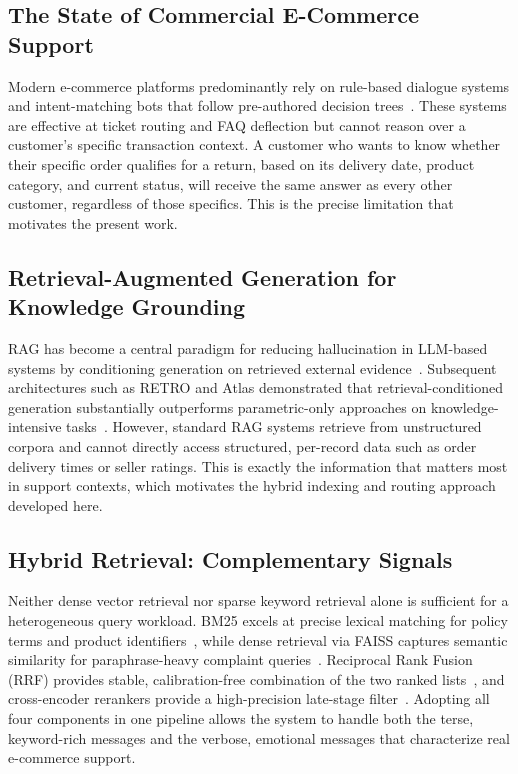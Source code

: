 \documentclass[conference]{IEEEtran}
\begin{document}
\subsection{The State of Commercial E-Commerce Support}
Modern e-commerce platforms predominantly rely on rule-based dialogue systems and
intent-matching bots that follow pre-authored decision trees~\cite{b21}. These
systems are effective at ticket routing and FAQ deflection but cannot reason over
a customer's specific transaction context. A customer who wants to know whether
their specific order qualifies for a return, based on its delivery date, product
category, and current status, will receive the same answer as every other customer,
regardless of those specifics. This is the precise limitation that motivates the
present work.

\subsection{Retrieval-Augmented Generation for Knowledge Grounding}
RAG has become a central paradigm for reducing hallucination in LLM-based systems
by conditioning generation on retrieved external evidence~\cite{b1,b2}. Subsequent
architectures such as RETRO and Atlas demonstrated that retrieval-conditioned
generation substantially outperforms parametric-only approaches on knowledge-intensive
tasks~\cite{b3,b4}. However, standard RAG systems retrieve from unstructured corpora
and cannot directly access structured, per-record data such as order delivery times
or seller ratings. This is exactly the information that matters most in support
contexts, which motivates the hybrid indexing and routing approach developed here.

\subsection{Hybrid Retrieval: Complementary Signals}
Neither dense vector retrieval nor sparse keyword retrieval alone is sufficient for
a heterogeneous query workload. BM25 excels at precise lexical matching for
policy terms and product identifiers~\cite{b5}, while dense retrieval via FAISS
captures semantic similarity for paraphrase-heavy complaint queries~\cite{b6,b8}.
Reciprocal Rank Fusion (RRF) provides stable, calibration-free combination of
the two ranked lists~\cite{b7}, and cross-encoder rerankers provide a high-precision
late-stage filter~\cite{b9}. Adopting all four components in one pipeline allows
the system to handle both the terse, keyword-rich messages and the verbose,
emotional messages that characterize real e-commerce support.
\end{document}
